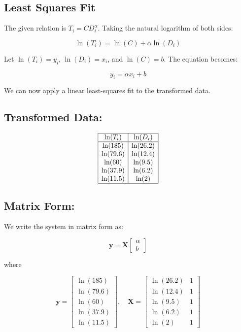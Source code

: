 \documentclass{article}
\begin{document}
\subsection{Least Squares Fit}

The given relation is \( T_i = C D_i^\alpha \). Taking the natural logarithm of both sides:

\[
\ln(T_i) = \ln(C) + \alpha \ln(D_i)
\]

Let \( \ln(T_i) = y_i \), \( \ln(D_i) = x_i \), and \( \ln(C) = b \). The equation becomes:

\[
y_i = \alpha x_i + b
\]

We can now apply a linear least-squares fit to the transformed data.

\subsection{Transformed Data:}

\[
\begin{array}{|c|c|}
\hline
\ln(T_i) & \ln(D_i) \\
\hline
\ln(185) & \ln(26.2) \\
\ln(79.6) & \ln(12.4) \\
\ln(60) & \ln(9.5) \\
\ln(37.9) & \ln(6.2) \\
\ln(11.5) & \ln(2) \\
\hline
\end{array}
\]

\subsection{Matrix Form:}

We write the system in matrix form as:

\[
\mathbf{y} = \mathbf{X} \begin{bmatrix} \alpha \\ b \end{bmatrix}
\]

where

\[
\mathbf{y} = \begin{bmatrix} \ln(185) \\ \ln(79.6) \\ \ln(60) \\ \ln(37.9) \\ \ln(11.5) \end{bmatrix}, \quad
\mathbf{X} = \begin{bmatrix} \ln(26.2) & 1 \\ \ln(12.4) & 1 \\ \ln(9.5) & 1 \\ \ln(6.2) & 1 \\ \ln(2) & 1 \end{bmatrix}
\]
\end{document}

